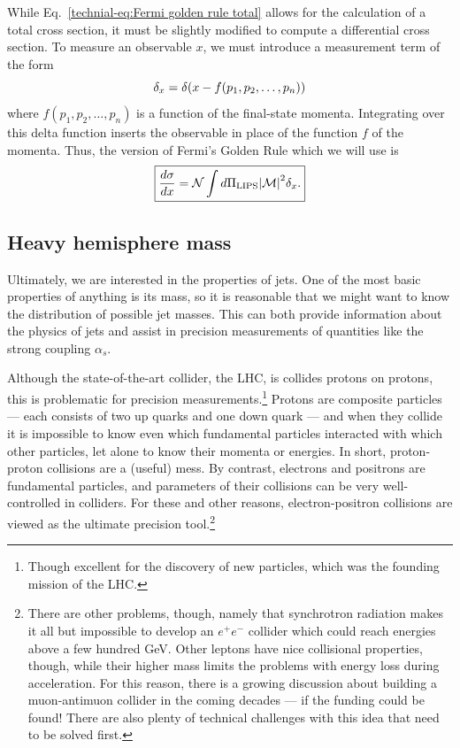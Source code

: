 \documentclass[../thesis.tex]{subfiles}
\providecommand{\LIPS}{\mathrm{LIPS}}
\providecommand{\cN}{\mathcal{N}}
\providecommand{\cM}{\mathcal{M}}
\begin{document}
	While Eq.~\ref{technial-eq:Fermi golden rule total} allows for the calculation of a total cross section, it must be slightly modified to compute a differential cross section. To measure an observable $x$, we must introduce a measurement term of the form
	\begin{equation}
		\delta_x = \delta\qty(x - f(p_1, p_2, \dots, p_n))
	\end{equation}
	where $f(p_1, p_2, \dots, p_n)$ is a function of the final-state momenta. Integrating over this delta function inserts the observable in place of the function $f$ of the momenta. Thus, the version of Fermi's Golden Rule which we will use is
	\begin{equation}\label{technical-eq:Fermi golden rule differential}
	\boxed{
		\frac{d\sigma}{dx} = \cN \int d\Pi_\LIPS \abs{\cM}^2 \delta_x.
	}
	\end{equation}

\subsection{Heavy hemisphere mass}
	Ultimately, we are interested in the properties of jets. One of the most basic properties of anything is its mass, so it is reasonable that we might want to know the distribution of possible jet masses. This can both provide information about the physics of jets and assist in precision measurements of quantities like the strong coupling $\alpha_s$.

	Although the state-of-the-art collider, the LHC, is collides protons on protons, this is problematic for precision measurements.\footnote{Though excellent for the discovery of new particles, which was the founding mission of the LHC.} Protons are composite particles --- each consists of two up quarks and one down quark --- and when they collide it is impossible to know even which fundamental particles interacted with which other particles, let alone to know their momenta or energies. In short, proton-proton collisions are a (useful) mess. By contrast, electrons and positrons are fundamental particles, and parameters of their collisions can be very well-controlled in colliders. For these and other reasons, electron-positron collisions are viewed as the ultimate precision tool.\footnote{There are other problems, though, namely that synchrotron radiation makes it all but impossible to develop an $e^+ e^-$ collider which could reach energies above a few hundred \si{\giga\electronvolt}. Other leptons have nice collisional properties, though, while their higher mass limits the problems with energy loss during acceleration. For this reason, there is a growing discussion about building a muon-antimuon collider in the coming decades --- if the funding could be found! There are also plenty of technical challenges with this idea that need to be solved first.}
\end{document}
